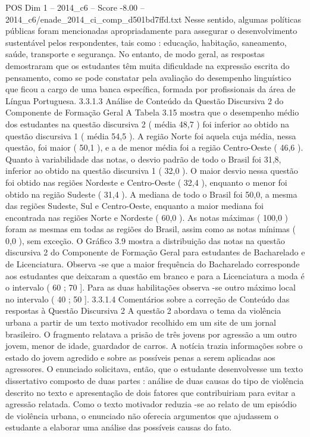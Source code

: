 \begin{textsample}{POS Dim 1 – 2014\_c6 – Score -8.00 – 2014\_c6/enade\_2014\_ci\_comp\_d501bd7ffd.txt}
Nesse sentido, algumas políticas públicas foram mencionadas apropriadamente para assegurar o desenvolvimento sustentável pelos respondentes, tais como : educação, habitação, saneamento, saúde, transporte e segurança.
No entanto, de modo geral, as respostas demostraram que os estudantes têm muita dificuldade na expressão escrita do pensamento, como se pode constatar pela avaliação do desempenho linguístico que ficou a cargo de uma banca específica, formada por profissionais da área de Língua Portuguesa. 3.3.1.3 Análise de Conteúdo da Questão Discursiva 2 do Componente de Formação Geral A Tabela 3.15 mostra que o desempenho médio dos estudantes na questão discursiva 2 ( média 48,7 ) foi inferior ao obtido na questão discursiva 1 ( média 54,5 ).
A região Norte foi aquela cuja média, nessa questão, foi maior ( 50,1 ), e a de menor média foi a região Centro-Oeste ( 46,6 ).
Quanto à variabilidade das notas, o desvio padrão de todo o Brasil foi 31,8, inferior ao obtido na questão discursiva 1 ( 32,0 ).
O maior desvio nessa questão foi obtido nas regiões Nordeste e Centro-Oeste ( 32,4 ), enquanto o menor foi obtido na região Sudeste ( 31,4 ).
A mediana de todo o Brasil foi 50,0, a mesma das regiões Sudeste, Sul e Centro-Oeste, enquanto a maior mediana foi encontrada nas regiões Norte e Nordeste ( 60,0 ).
As notas máximas ( 100,0 ) foram as mesmas em todas as regiões do Brasil, assim como as notas mínimas ( 0,0 ), sem exceção.
O Gráfico 3.9 mostra a distribuição das notas na questão discursiva 2 do Componente de Formação Geral para estudantes de Bacharelado e de Licenciatura.
Observa -se que a maior frequência do Bacharelado corresponde aos estudantes que deixaram a questão em branco e para a Licenciatura a moda é o intervalo ( 60 ; 70 ].
Para as duas habilitações observa -se outro máximo local no intervalo ( 40 ; 50 ]. 3.3.1.4 Comentários sobre a correção de Conteúdo das respostas à Questão Discursiva 2 A questão 2 abordava o tema da violência urbana a partir de um texto motivador recolhido em um site de um jornal brasileiro.
O fragmento relatava a prisão de três jovens por agressão a um outro jovem, menor de idade, guardador de carros.
A notícia trazia informações sobre o estado do jovem agredido e sobre as possíveis penas a serem aplicadas aos agressores.
O enunciado solicitava, então, que o estudante desenvolvesse um texto dissertativo composto de duas partes : análise de duas causas do tipo de violência descrito no texto e apresentação de dois fatores que contribuiriam para evitar a agressão relatada.
Como o texto motivador reduzia -se ao relato de um episódio de violência urbana, o enunciado não oferecia argumentos que ajudassem o estudante a elaborar uma análise das possíveis causas do fato.

\end{textsample}
